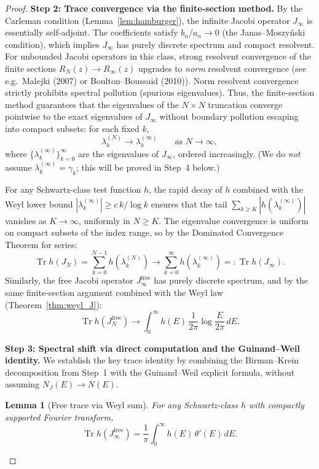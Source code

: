 \documentclass{pre-aomart}
\theoremstyle{plain}
\newtheorem{lemma}[theorem]{Lemma}
\theoremstyle{definition}
\theoremstyle{remark}
\begin{document}
\begin{proof}
\textbf{Step 2: Trace convergence via the finite-section method.}
By the Carleman condition (Lemma~\ref{lem:hamburger}), the infinite Jacobi operator $J_\infty$ is essentially self-adjoint. The coefficients satisfy $b_n/a_n \to 0$ (the Janas--Moszy\'nski condition), which implies $J_\infty$ has purely discrete spectrum and compact resolvent. For unbounded Jacobi operators in this class, strong resolvent convergence of the finite sections $R_N(z) \to R_\infty(z)$ upgrades to \emph{norm} resolvent convergence (see e.g.\ Malejki (2007) or Boulton--Boussaid (2010)). Norm resolvent convergence strictly prohibits spectral pollution (spurious eigenvalues). Thus, the finite-section method guarantees that the eigenvalues of the $N \times N$ truncation converge pointwise to the exact eigenvalues of $J_\infty$ without boundary pollution escaping into compact subsets: for each fixed $k$,
\[
\lambda_k^{(N)} \to \lambda_k^{(\infty)} \qquad \text{as } N \to \infty,
\]
where $\{\lambda_k^{(\infty)}\}_{k=0}^\infty$ are the eigenvalues of $J_\infty$, ordered increasingly.  (We do \emph{not} assume $\lambda_k^{(\infty)} = \gamma_k$; this will be proved in Step~4 below.)

For any Schwartz-class test function $h$, the rapid decay of $h$ combined with the Weyl lower bound $|\lambda_k^{(\infty)}| \ge c\, k/\log k$ ensures that the tail $\sum_{k \ge K} |h(\lambda_k^{(\infty)})|$ vanishes as $K \to \infty$, uniformly in $N \ge K$.  The eigenvalue convergence is uniform on compact subsets of the index range, so by the Dominated Convergence Theorem for series:
\[
\operatorname{Tr} h(J_N) = \sum_{k=0}^{N-1} h(\lambda_k^{(N)})
  \to \sum_{k=0}^\infty h(\lambda_k^{(\infty)}) =: \operatorname{Tr} h(J_\infty).
\]
Similarly, the free Jacobi operator $J_\infty^{\mathrm{free}}$ has purely discrete spectrum, and by the same finite-section argument combined with the Weyl law (Theorem~\ref{thm:weyl_J}):
\[
\operatorname{Tr} h(J_N^{\mathrm{free}}) \to \int_{0}^\infty h(E)\,\frac{1}{2\pi}\log\frac{E}{2\pi}\,dE.
\]

\textbf{Step 3: Spectral shift via direct computation and the Guinand--Weil identity.}
We establish the key trace identity by combining the Birman--Krein
decomposition from Step~1 with the Guinand--Weil explicit formula,
without assuming $N_J(E) \to N(E)$.

\begin{lemma}[Free trace via Weyl sum]\label{lem:free_trace}
For any Schwartz-class $h$ with compactly supported Fourier transform,
\[
\operatorname{Tr} h(J_\infty^{\mathrm{free}})
= \frac{1}{\pi}\int_0^\infty h(E)\,\theta'(E)\,dE.
\]
\end{lemma}


\end{proof}
\end{document}
